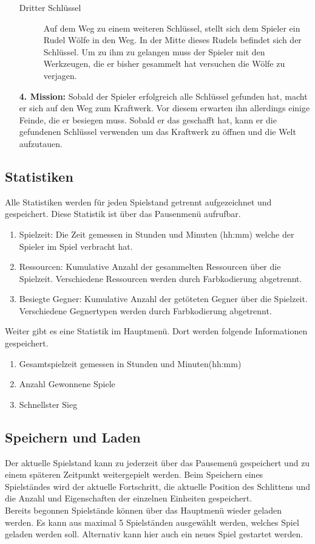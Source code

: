 \documentclass[a4paper,
  twoside, %
  headlines=2.1 %
  ]{scrartcl}
\begin{document}
\begin{itemize}
\begin{description}
					\item[Dritter Schlüssel]
						Auf dem Weg zu einem weiteren Schlüssel, stellt sich dem Spieler ein Rudel Wölfe in den Weg. In der Mitte dieses Rudels befindet sich der Schlüssel. Um zu ihm zu gelangen muss der Spieler mit den Werkzeugen, die er bisher gesammelt hat versuchen die Wölfe zu verjagen. \\
					\end{description}
		\item[\textbf{4. Mission:}]
			Sobald der Spieler erfolgreich alle Schlüssel gefunden hat, macht er sich auf den Weg zum Kraftwerk. Vor diesem erwarten ihn allerdings einige Feinde, die er besiegen muss. Sobald er das geschafft hat, kann er die gefundenen Schlüssel verwenden um das Kraftwerk zu öffnen und die Welt aufzutauen.

	\end{itemize}	

	\subsection{Statistiken}
		Alle Statistiken werden für jeden Spielstand getrennt aufgezeichnet und gespeichert. Diese Statistik ist über das Pausenmenü aufrufbar.
		\begin{enumerate}
			\item Spielzeit: Die Zeit gemessen in Stunden und Minuten (hh:mm) welche der Spieler im Spiel verbracht hat.
			\item Ressourcen: Kumulative Anzahl der gesammelten Ressourcen über die Spielzeit. Verschiedene Ressourcen werden durch Farbkodierung abgetrennt.
			\item Besiegte Gegner: Kumulative Anzahl der getöteten Gegner über die Spielzeit. Verschiedene Gegnertypen werden durch Farbkodierung abgetrennt.
		\end{enumerate}
		Weiter gibt es eine Statistik im Hauptmenü. Dort werden folgende Informationen gespeichert.
		\begin{enumerate}
		    \item Gesamtspielzeit gemessen in Stunden und Minuten(hh:mm)
		    \item Anzahl Gewonnene Spiele
		    \item Schnellster Sieg
		    
		\end{enumerate}
		
	\subsection{Speichern und Laden}
		Der aktuelle Spielstand kann zu jederzeit über das Pausemenü
		gespeichert und zu einem späteren Zeitpunkt weitergepielt werden. Beim Speichern eines Spielständes wird der aktuelle Fortschritt, die
		aktuelle Position des Schlittens und die Anzahl und Eigenschaften der
		einzelnen Einheiten gespeichert. \\
		Bereits begonnen Spielstände können über das Hauptmenü wieder geladen
		werden. Es kann aus maximal 5 Spielständen ausgewählt werden, welches Spiel geladen werden soll. Alternativ kann hier auch ein neues Spiel gestartet werden.
\end{document}
